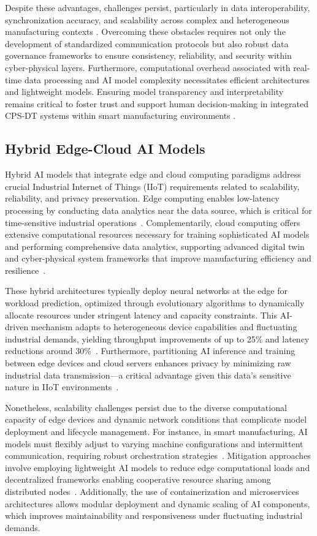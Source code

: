 \documentclass[sigconf]{acmart}
\begin{document}
Despite these advantages, challenges persist, particularly in data interoperability, synchronization accuracy, and scalability across complex and heterogeneous manufacturing contexts \cite{ref13}. Overcoming these obstacles requires not only the development of standardized communication protocols but also robust data governance frameworks to ensure consistency, reliability, and security within cyber-physical layers. Furthermore, computational overhead associated with real-time data processing and AI model complexity necessitates efficient architectures and lightweight models. Ensuring model transparency and interpretability remains critical to foster trust and support human decision-making in integrated CPS-DT systems within smart manufacturing environments \cite{ref12}.

\subsection{Hybrid Edge-Cloud AI Models}

Hybrid AI models that integrate edge and cloud computing paradigms address crucial Industrial Internet of Things (IIoT) requirements related to scalability, reliability, and privacy preservation. Edge computing enables low-latency processing by conducting data analytics near the data source, which is critical for time-sensitive industrial operations~\cite{ref15}. Complementarily, cloud computing offers extensive computational resources necessary for training sophisticated AI models and performing comprehensive data analytics, supporting advanced digital twin and cyber-physical system frameworks that improve manufacturing efficiency and resilience~\cite{ref22}.

These hybrid architectures typically deploy neural networks at the edge for workload prediction, optimized through evolutionary algorithms to dynamically allocate resources under stringent latency and capacity constraints. This AI-driven mechanism adapts to heterogeneous device capabilities and fluctuating industrial demands, yielding throughput improvements of up to 25\% and latency reductions around 30\%~\cite{ref31}. Furthermore, partitioning AI inference and training between edge devices and cloud servers enhances privacy by minimizing raw industrial data transmission—a critical advantage given this data's sensitive nature in IIoT environments~\cite{ref22}.

Nonetheless, scalability challenges persist due to the diverse computational capacity of edge devices and dynamic network conditions that complicate model deployment and lifecycle management. For instance, in smart manufacturing, AI models must flexibly adjust to varying machine configurations and intermittent communication, requiring robust orchestration strategies~\cite{ref33}. Mitigation approaches involve employing lightweight AI models to reduce edge computational loads and decentralized frameworks enabling cooperative resource sharing among distributed nodes~\cite{ref31,ref33}. Additionally, the use of containerization and microservices architectures allows modular deployment and dynamic scaling of AI components, which improves maintainability and responsiveness under fluctuating industrial demands.
\end{document}

